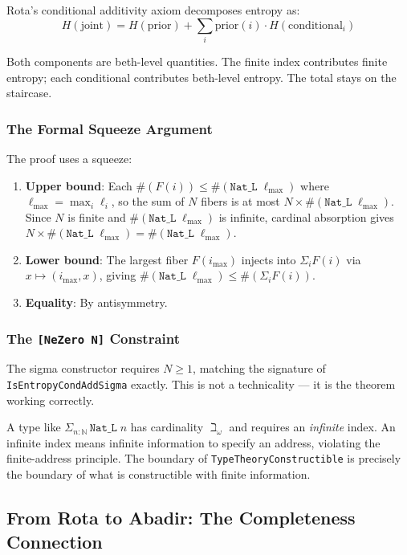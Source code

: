 \documentclass{report}
\begin{document}
Rota's conditional additivity axiom decomposes entropy as:
$$H(\text{joint}) = H(\text{prior}) + \sum_i \text{prior}(i) \cdot H(\text{conditional}_i)$$

Both components are beth-level quantities. The finite index contributes
finite entropy; each conditional contributes beth-level entropy. The total
stays on the staircase.

\subsubsection{The Formal Squeeze Argument}

The proof uses a squeeze:

\begin{enumerate}
\item \textbf{Upper bound}: Each $\#(F(i)) \leq \#(\texttt{Nat\_L}\;\ell_{\max})$
where $\ell_{\max} = \max_i \ell_i$, so the sum of $N$ fibers is at most
$N \times \#(\texttt{Nat\_L}\;\ell_{\max})$. Since $N$ is finite and
$\#(\texttt{Nat\_L}\;\ell_{\max})$ is infinite, cardinal absorption gives
$N \times \#(\texttt{Nat\_L}\;\ell_{\max}) = \#(\texttt{Nat\_L}\;\ell_{\max})$.

\item \textbf{Lower bound}: The largest fiber $F(i_{\max})$ injects into
$\Sigma_i F(i)$ via $x \mapsto (i_{\max}, x)$, giving
$\#(\texttt{Nat\_L}\;\ell_{\max}) \leq \#(\Sigma_i F(i))$.

\item \textbf{Equality}: By antisymmetry.
\end{enumerate}

\subsubsection{The \texttt{[NeZero N]} Constraint}

The sigma constructor requires $N \geq 1$, matching the signature of
\texttt{IsEntropyCondAddSigma} exactly. This is not a technicality --- it is
the theorem working correctly.

A type like $\Sigma_{n : \mathbb{N}}\, \texttt{Nat\_L}\; n$ has cardinality
$\beth_\omega$ and requires an \emph{infinite} index. An infinite index means
infinite information to specify an address, violating the finite-address
principle. The boundary of \texttt{TypeTheoryConstructible} is precisely the
boundary of what is constructible with finite information.

\subsection{From Rota to Abadir: The Completeness Connection}
\end{document}
